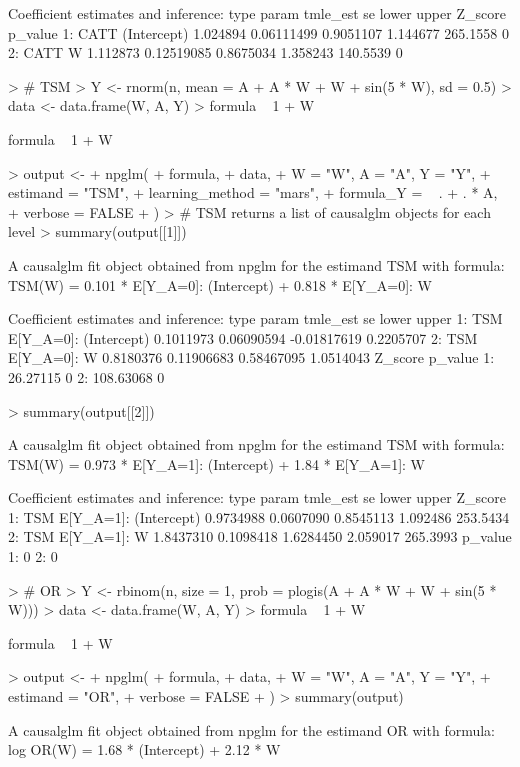 \documentclass[article]{jss}
\begin{document}
\begin{Schunk}
\begin{Soutput}
Coefficient estimates and inference:
   type       param tmle_est         se     lower    upper  Z_score p_value
1: CATT (Intercept) 1.024894 0.06111499 0.9051107 1.144677 265.1558       0
2: CATT           W 1.112873 0.12519085 0.8675034 1.358243 140.5539       0
\end{Soutput}
\begin{Sinput}
> # TSM
> Y <- rnorm(n, mean = A + A * W + W + sin(5 * W), sd = 0.5)
> data <- data.frame(W, A, Y)
> formula ~ 1 + W
\end{Sinput}
\begin{Soutput}
formula ~ 1 + W
\end{Soutput}
\begin{Sinput}
> output <-
+   npglm(
+     formula,
+     data,
+     W = "W", A = "A", Y = "Y",
+     estimand = "TSM",
+     learning_method = "mars",
+     formula_Y = ~ . + . * A,
+     verbose = FALSE
+   )
> # TSM returns a list of causalglm objects for each level
> summary(output[[1]])
\end{Sinput}
\begin{Soutput}
A causalglm fit object obtained from npglm for the estimand TSM with formula: 
TSM(W) = 0.101 * E[Y_{A=0}]: (Intercept) + 0.818 * E[Y_{A=0}]: W

Coefficient estimates and inference:
   type                   param  tmle_est         se       lower     upper
1:  TSM E[Y_{A=0}]: (Intercept) 0.1011973 0.06090594 -0.01817619 0.2205707
2:  TSM           E[Y_{A=0}]: W 0.8180376 0.11906683  0.58467095 1.0514043
     Z_score p_value
1:  26.27115       0
2: 108.63068       0
\end{Soutput}
\begin{Sinput}
> summary(output[[2]])
\end{Sinput}
\begin{Soutput}
A causalglm fit object obtained from npglm for the estimand TSM with formula: 
TSM(W) = 0.973 * E[Y_{A=1}]: (Intercept) + 1.84 * E[Y_{A=1}]: W

Coefficient estimates and inference:
   type                   param  tmle_est        se     lower    upper  Z_score
1:  TSM E[Y_{A=1}]: (Intercept) 0.9734988 0.0607090 0.8545113 1.092486 253.5434
2:  TSM           E[Y_{A=1}]: W 1.8437310 0.1098418 1.6284450 2.059017 265.3993
   p_value
1:       0
2:       0
\end{Soutput}
\begin{Sinput}
> # OR
> Y <- rbinom(n, size = 1, prob = plogis(A + A * W + W + sin(5 * W)))
> data <- data.frame(W, A, Y)
> formula ~ 1 + W
\end{Sinput}
\begin{Soutput}
formula ~ 1 + W
\end{Soutput}
\begin{Sinput}
> output <-
+   npglm(
+     formula,
+     data,
+     W = "W", A = "A", Y = "Y",
+     estimand = "OR",
+     verbose = FALSE
+   )
> summary(output)
\end{Sinput}
\begin{Soutput}
A causalglm fit object obtained from npglm for the estimand OR with formula: 
log OR(W) = 1.68 * (Intercept) + 2.12 * W


\end{Soutput}
\end{Schunk}
\end{document}

